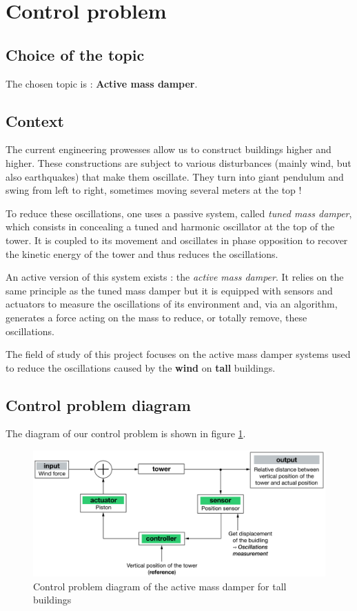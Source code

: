 \section{Control problem}

\subsection{Choice of the topic}
The chosen topic is : {\bf Active mass damper}.

\subsection{Context}
The current engineering prowesses allow us to construct buildings higher and higher. These constructions are subject to various disturbances (mainly wind, but also earthquakes) that make them oscillate. They turn into giant pendulum and swing from left to right, sometimes moving several meters at the top ! \cite{YouTube_minutephysics}\par
To reduce these oscillations, one uses a passive system, called {\it tuned mass damper}, which consists in concealing a tuned and harmonic oscillator at the top of the tower. It is coupled to its movement and oscillates in phase opposition to recover the kinetic energy of the tower and thus reduces the oscillations. \cite{Wikipedia_amortisseur_tmd}\par
An active version of this system exists : the {\it active mass damper}. It relies on the same principle as the tuned mass damper but it is equipped with sensors and actuators to measure the oscillations of its environment and, via an algorithm, generates a force acting on the mass to reduce, or totally remove, these oscillations. \cite{YANG201718}\par
The field of study of this project focuses on the active mass damper systems used to reduce the oscillations caused by the {\bf wind} on {\bf tall} buildings.

\subsection{Control problem diagram}
The diagram of our control problem is shown in figure \ref{fig:diagram}.
\begin{figure}[!ht]
    \centering
    \includegraphics[width=\textwidth]{resources/pdf/1_control-problem-diagram.pdf}
    \caption{Control problem diagram of the active mass damper for tall buildings}
    \label{fig:diagram}
\end{figure}

